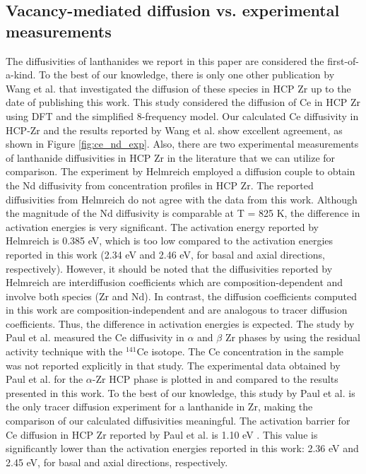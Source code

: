 \documentclass[preprint,12pt]{elsarticle}
\begin{document}
\subsection{Vacancy-mediated diffusion vs. experimental measurements}
The diffusivities of lanthanides we report in this paper are considered the first-of-a-kind. To the best of our knowledge, there is only one other publication by Wang et al.\cite{wang_first_2019} that investigated the diffusion of these species in HCP Zr up to the date of publishing this work. This study considered the diffusion of Ce in HCP Zr using DFT and the simplified 8-frequency model. Our calculated Ce diffusivity in HCP-Zr and the results reported by Wang et al.\cite{wang_first_2019} show excellent agreement, as shown in Figure \ref{fig:ce_nd_exp}. Also, there are two experimental measurements of lanthanide diffusivities in HCP Zr in the literature that we can utilize for comparison. The experiment by Helmreich \cite{helmreich_diffusion_2014} employed a diffusion couple to obtain the Nd diffusivity from concentration profiles in HCP Zr. The reported diffusivities from Helmreich do not agree with the data from this work. Although the magnitude of the Nd diffusivity is comparable at T = 825 K, the difference in activation energies is very significant. The activation energy reported by Helmreich is 0.385 eV, which is too low compared to the activation energies reported in this work (2.34 eV and 2.46 eV, for basal and axial directions, respectively). However, it should be noted that the diffusivities reported by Helmreich are interdiffusion coefficients which are composition-dependent and involve both species (Zr and Nd). In contrast, the diffusion coefficients computed in this work are composition-independent and are analogous to tracer diffusion coefficients. Thus, the difference in activation energies is expected. The study by Paul et al. \cite{paul_diffusion_1968} measured the Ce diffusivity in $\alpha$ and $\beta$ Zr phases by using the residual activity technique with the $^{141}$Ce isotope. The Ce concentration in the sample was not reported explicitly in that study. The experimental data obtained by Paul et al. \cite{paul_diffusion_1968} for the $\alpha$-Zr HCP phase is plotted in  and compared to the results presented in this work. To the best of our knowledge, this study by Paul et al. \cite{paul_diffusion_1968} is the only tracer diffusion experiment for a lanthanide in Zr, making the comparison of our calculated diffusivities meaningful. The activation barrier for Ce diffusion in HCP Zr reported by Paul et al. is 1.10 eV \cite{paul_diffusion_1968}. This value is significantly lower than the activation energies reported in this work: 2.36 eV and 2.45 eV, for basal and axial directions, respectively. 
\end{document}
